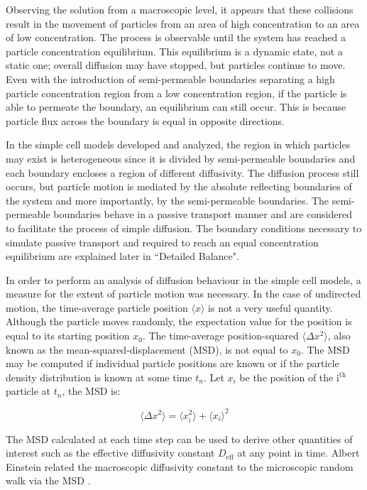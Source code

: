 	Observing the solution from a macroscopic level, it appears that these collisions result in the movement of particles from an area of high concentration to an area of low concentration. The process is observable until the system has reached a particle concentration equilibrium. This equilibrium is a dynamic state, not a static one; overall diffusion may have stopped, but particles continue to move.	Even with the introduction of semi-permeable boundaries separating a high particle concentration region from a low concentration region, if the particle is able to permeate the boundary, an equilibrium can still occur. This is because particle flux across the boundary is equal in opposite directions.
	
	In the simple cell models developed and analyzed, the region in which particles may exist is heterogeneous since it is divided by semi-permeable boundaries and each boundary encloses a region of different diffusivity. The diffusion process still occurs, but particle motion is mediated by the absolute reflecting boundaries of the system and more importantly, by the semi-permeable boundaries. The semi-permeable boundaries behave in a passive transport manner and are considered to facilitate the process of simple diffusion. The boundary conditions necessary to simulate passive transport and required to reach an equal concentration equilibrium are explained later in ``Detailed Balance".
	
	In order to perform an analysis of diffusion behaviour in the simple cell models, a measure for the extent of particle motion was necessary. In the case of undirected motion, the time-average particle position $ \langle x \rangle $ is not a very useful quantity. Although the particle moves randomly, the expectation value for the position is equal to its starting position $ x_0 $. The time-average position-squared $ \langle \Delta x^2 \rangle $, also known as the mean-squared-displacement (MSD), is not equal to $ x_0 $. The MSD may be computed if individual particle positions are known or if the particle density distribution is known at some time $ t_n $. Let $ x_i $ be the position of the $ \textrm{i}^\textrm{th} $ particle at $ t_n $, the MSD is:
		
	\begin{equation}
		\langle \Delta x^2 \rangle = \langle x_{i}^2 \rangle + \langle x_i \rangle^2
	\end{equation}
	
	The MSD calculated at each time step can be used to derive other quantities of interest such as the effective diffusivity constant $ D_\textrm{eff} $ at any point in time. Albert Einstein related the macroscopic diffusivity constant to the microscopic random walk via the MSD \citep{diffusion-1}.
	
